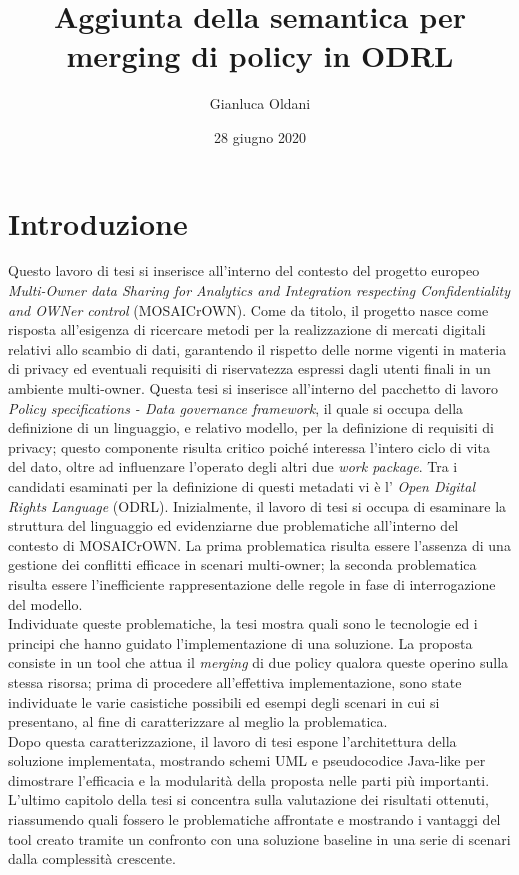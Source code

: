 \documentclass[12pt,a4paper,twoside]{book}
\title{Aggiunta della semantica per merging di policy in ODRL }
\date{28 giugno 2020}
\author{Gianluca Oldani}
\begin{document}
\maketitle
\tableofcontents
\chapter{Introduzione}
Questo lavoro di tesi si inserisce all'interno del contesto del progetto europeo \textit{Multi-Owner data Sharing for Analytics and Integration respecting Confidentiality and OWNer control} (MOSAICrOWN). Come da titolo, il progetto nasce come risposta all'esigenza di ricercare metodi per la realizzazione di mercati digitali relativi allo scambio di dati, garantendo il rispetto delle norme vigenti in materia di privacy ed eventuali requisiti di riservatezza espressi dagli utenti finali in un ambiente multi-owner. Questa tesi si inserisce all'interno del pacchetto di lavoro \textit{Policy specifications - Data governance framework}, il quale si occupa della definizione di un linguaggio, e relativo modello, per la definizione di requisiti di privacy; questo componente risulta critico poiché interessa l'intero ciclo di vita del dato, oltre ad influenzare l'operato degli altri due \textit{work package}. Tra i candidati esaminati per la definizione di questi metadati vi è l' \textit{Open Digital Rights Language} (ODRL). Inizialmente, il lavoro di tesi si occupa di esaminare la struttura del linguaggio ed evidenziarne due problematiche all'interno del contesto di MOSAICrOWN. La prima problematica risulta essere l'assenza di una gestione dei conflitti efficace in scenari multi-owner; la seconda problematica risulta essere l'inefficiente rappresentazione delle regole in fase di interrogazione del modello.\\
Individuate queste problematiche, la tesi mostra quali sono le tecnologie ed i principi che hanno guidato l'implementazione di una soluzione. La proposta consiste in un tool che attua il \textit{merging} di due policy qualora queste operino sulla stessa risorsa; prima di procedere all'effettiva implementazione, sono state individuate le varie casistiche possibili ed esempi degli scenari in cui si presentano, al fine di caratterizzare al meglio la problematica.\\Dopo questa caratterizzazione, il lavoro di tesi espone l'architettura della soluzione implementata, mostrando schemi UML e pseudocodice Java-like per dimostrare l'efficacia e la modularità della proposta nelle parti più importanti.\\
L'ultimo capitolo della tesi si concentra sulla valutazione dei risultati ottenuti, riassumendo quali fossero le problematiche affrontate e mostrando i vantaggi del tool creato tramite un confronto con una soluzione baseline in una serie di scenari dalla complessità crescente.
\end{document}
